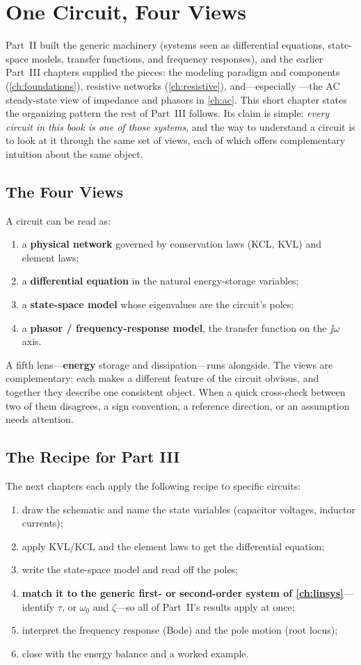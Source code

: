 \chapter{One Circuit, Four Views}
\label{ch:fourviews}
Part~II built the generic machinery (systems seen as differential equations,
state-space models, transfer functions, and frequency responses), and the earlier
Part~III chapters supplied the pieces: the modeling paradigm and components
(\cref{ch:foundations}), resistive networks (\cref{ch:resistive}), and---especially
---the AC steady-state view of impedance and phasors in \cref{ch:ac}. This short chapter
states the organizing pattern the rest of Part~III follows. Its claim is simple:
\emph{every circuit in this book is one of those systems}, and the way to
understand a circuit is to look at it through the same set of views, each of which
offers complementary intuition about the same object.

\section{The Four Views}
A circuit can be read as:
\begin{enumerate}
\item a \textbf{physical network} governed by conservation laws (KCL, KVL) and
element laws;
\item a \textbf{differential equation} in the natural energy-storage variables;
\item a \textbf{state-space model} whose eigenvalues are the circuit's poles;
\item a \textbf{phasor / frequency-response model}, the transfer function on the
\(\jj\omega\) axis.
\end{enumerate}
A fifth lens---\textbf{energy} storage and dissipation---runs alongside. The
views are complementary: each makes a different feature of
the circuit obvious, and together they describe one consistent object. When a
quick cross-check between two of them disagrees, a sign convention, a reference
direction, or an assumption needs attention.

\section{The Recipe for Part III}
The next chapters each apply the following recipe to specific circuits:
\begin{enumerate}
\item draw the schematic and name the state variables (capacitor voltages,
inductor currents);
\item apply KVL/KCL and the element laws to get the differential equation;
\item write the state-space model and read off the poles;
\item \textbf{match it to the generic first- or second-order system of
\cref{ch:linsys}}---identify \(\tau\), or \(\omega_0\) and \(\zeta\)---so all of
Part~II's results apply at once;
\item interpret the frequency response (Bode) and the pole motion (root locus);
\item close with the energy balance and a worked example.
\end{enumerate}


